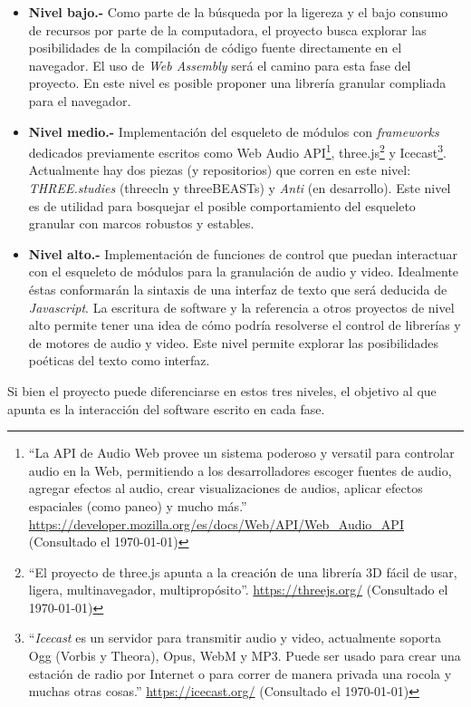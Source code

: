 \begin{itemize}


\item \textbf{Nivel bajo.-} Como parte de la búsqueda por la ligereza y el bajo consumo de recursos por parte de la computadora, el proyecto busca explorar las posibilidades de la compilación de código fuente directamente en el navegador. El uso de \textit{Web Assembly} será el camino para esta fase del proyecto. En este nivel es posible proponer una librería granular compliada para el navegador. 
\item \textbf{Nivel medio.-} Implementación del esqueleto de módulos con \textit{frameworks} dedicados previamente escritos como Web Audio API\footnote{``La API de Audio Web provee un sistema poderoso y versatil para controlar audio en la Web, permitiendo a los desarrolladores escoger fuentes de audio, agregar efectos al audio, crear visualizaciones de audios, aplicar efectos espaciales (como paneo) y mucho más.'' \url{https://developer.mozilla.org/es/docs/Web/API/Web_Audio_API} (Consultado el \today)}, three.js\footnote{``El proyecto de three.js apunta a la creación de una librería 3D fácil de usar, ligera, multinavegador, multipropósito''. \url{https://threejs.org/} (Consultado el \today)} y Icecast\footnote{``\textit{Icecast} es un servidor para transmitir audio y video, actualmente soporta Ogg (Vorbis y Theora), Opus, WebM y MP3. Puede ser usado para crear una estación de radio por Internet o para correr de manera privada una rocola y muchas otras cosas.'' \url{https://icecast.org/} (Consultado el \today)}. Actualmente hay dos piezas (y repositorios) que corren en este nivel: \textit{THREE.studies} (threecln y threeBEASTs) y \textit{Anti} (en desarrollo). Este nivel es de utilidad para bosquejar el posible comportamiento del esqueleto granular con marcos robustos y estables. 
\item \textbf{Nivel alto.-} Implementación de funciones de control que puedan interactuar con el esqueleto de módulos para la granulación de audio y video. Idealmente éstas conformarán la sintaxis de una interfaz de texto que será deducida de \textit{Javascript}. La escritura de software y la referencia a otros proyectos de nivel alto permite tener una idea de cómo podría resolverse el control de librerías y de motores de audio y video. Este nivel permite explorar las posibilidades poéticas del texto como interfaz. 
  
\end{itemize}

Si bien el proyecto puede diferenciarse en estos tres niveles, el objetivo al que apunta es la interacción del software escrito en cada fase.

